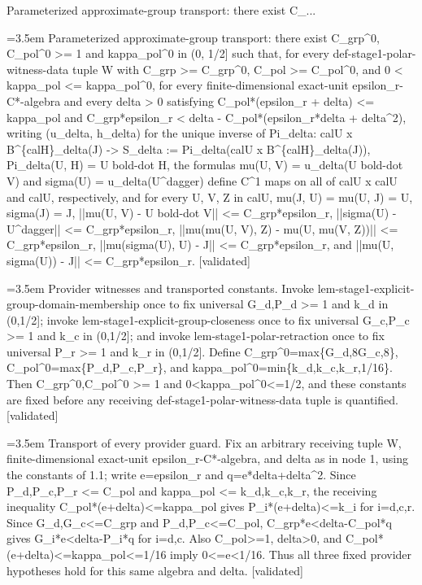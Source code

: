 \documentclass{article}
\newcommand{\step}[1]{\par\noindent\hangindent=3.5em\hangafter=1%
  \makebox[3.5em][l]{\textbf{#1.}}}
\newcommand{\steptag}[1]{\hfill{\small\textsf{[#1]}}}
\begin{document}
\begin{proofbox}{Parameterized approximate-group transport: there exist C\_...}
\step{1} Parameterized approximate-group transport: there exist C\_grp\textasciicircum{}0, C\_pol\textasciicircum{}0 >= 1 and kappa\_pol\textasciicircum{}0 in (0, 1/2] such that, for every def-stage1-polar-witness-data tuple W with C\_grp >= C\_grp\textasciicircum{}0, C\_pol >= C\_pol\textasciicircum{}0, and 0 < kappa\_pol <= kappa\_pol\textasciicircum{}0, for every finite-dimensional exact-unit epsilon\_r-C*-algebra and every delta > 0 satisfying C\_pol*(epsilon\_r + delta) <= kappa\_pol and C\_grp*epsilon\_r < delta - C\_pol*(epsilon\_r*delta + delta\textasciicircum{}2), writing (u\_delta, h\_delta) for the unique inverse of Pi\_delta: calU x B\textasciicircum{}\{calH\}\_delta(J) -> S\_delta := Pi\_delta(calU x B\textasciicircum{}\{calH\}\_delta(J)), Pi\_delta(U, H) = U bold-dot H, the formulas mu(U, V) = u\_delta(U bold-dot V) and sigma(U) = u\_delta(U\textasciicircum{}dagger) define C\textasciicircum{}1 maps on all of calU x calU and calU, respectively, and for every U, V, Z in calU, mu(J, U) = mu(U, J) = U, sigma(J) = J, ||mu(U, V) - U bold-dot V|| <= C\_grp*epsilon\_r, ||sigma(U) - U\textasciicircum{}dagger|| <= C\_grp*epsilon\_r, ||mu(mu(U, V), Z) - mu(U, mu(V, Z))|| <= C\_grp*epsilon\_r, ||mu(sigma(U), U) - J|| <= C\_grp*epsilon\_r, and ||mu(U, sigma(U)) - J|| <= C\_grp*epsilon\_r. \steptag{validated} \\[6pt]
\step{1.1} Provider witnesses and transported constants. Invoke lem-stage1-explicit-group-domain-membership once to fix universal G\_d,P\_d >= 1 and k\_d in (0,1/2]; invoke lem-stage1-explicit-group-closeness once to fix universal G\_c,P\_c >= 1 and k\_c in (0,1/2]; and invoke lem-stage1-polar-retraction once to fix universal P\_r >= 1 and k\_r in (0,1/2]. Define C\_grp\textasciicircum{}0=max\{G\_d,8G\_c,8\}, C\_pol\textasciicircum{}0=max\{P\_d,P\_c,P\_r\}, and kappa\_pol\textasciicircum{}0=min\{k\_d,k\_c,k\_r,1/16\}. Then C\_grp\textasciicircum{}0,C\_pol\textasciicircum{}0 >= 1 and 0<kappa\_pol\textasciicircum{}0<=1/2, and these constants are fixed before any receiving def-stage1-polar-witness-data tuple is quantified. \steptag{validated} \\[4pt]
\step{1.2} Transport of every provider guard. Fix an arbitrary receiving tuple W, finite-dimensional exact-unit epsilon\_r-C*-algebra, and delta as in node 1, using the constants of 1.1; write e=epsilon\_r and q=e*delta+delta\textasciicircum{}2. Since P\_d,P\_c,P\_r <= C\_pol and kappa\_pol <= k\_d,k\_c,k\_r, the receiving inequality C\_pol*(e+delta)<=kappa\_pol gives P\_i*(e+delta)<=k\_i for i=d,c,r. Since G\_d,G\_c<=C\_grp and P\_d,P\_c<=C\_pol, C\_grp*e<delta-C\_pol*q gives G\_i*e<delta-P\_i*q for i=d,c. Also C\_pol>=1, delta>0, and C\_pol*(e+delta)<=kappa\_pol<=1/16 imply 0<=e<1/16. Thus all three fixed provider hypotheses hold for this same algebra and delta. \steptag{validated} \\[4pt]

\end{proofbox}
\end{document}

